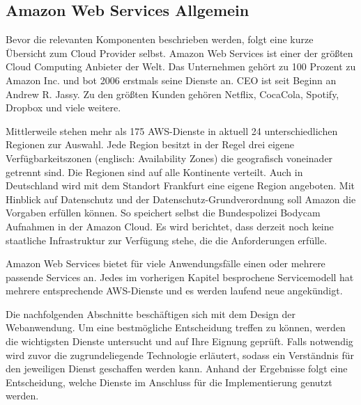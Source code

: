 \subsection{Amazon Web Services Allgemein}

Bevor die relevanten Komponenten beschrieben werden, folgt eine kurze Übersicht zum Cloud Provider selbst.
Amazon Web Services ist einer der größten Cloud Computing Anbieter der Welt. Das Unternehmen gehört zu 100 Prozent zu Amazon Inc. und bot 2006 erstmals seine Dienste an. CEO ist seit Beginn an Andrew R. Jassy.
Zu den größten Kunden gehören Netflix, CocaCola, Spotify, Dropbox und viele weitere. \cite[]{AWSAllgemein}

Mittlerweile stehen mehr als 175 AWS-Dienste in aktuell 24 unterschiedlichen Regionen zur Auswahl.
Jede Region besitzt in der Regel drei eigene Verfügbarkeitszonen (englisch: Availability Zones) die geografisch voneinader getrennt sind.
Die Regionen sind auf alle Kontinente verteilt.
Auch in Deutschland wird mit dem Standort Frankfurt eine eigene Region angeboten.
Mit Hinblick auf Datenschutz und der Datenschutz-Grundverordnung soll Amazon die Vorgaben erfüllen können.
So speichert selbst die Bundespolizei Bodycam Aufnahmen in der Amazon Cloud.\cite[]{AWSPolizei}
Es wird berichtet, {}\glqq dass derzeit noch keine staatliche Infrastruktur zur Verfügung stehe, die die Anforderungen erfülle.\grqq{}
\cite[Abschnitt 1]{AWSPolizei}

Amazon Web Services bietet für viele Anwendungsfälle einen oder mehrere passende Services an.
Jedes im vorherigen Kapitel besprochene Servicemodell hat mehrere entsprechende AWS-Dienste und es werden laufend neue angekündigt.


Die nachfolgenden Abschnitte beschäftigen sich mit dem Design der Webanwendung.
Um eine bestmögliche Entscheidung treffen zu können, werden die wichtigsten Dienste untersucht und auf Ihre Eignung geprüft.
Falls notwendig wird zuvor die zugrundeliegende Technologie erläutert, sodass ein Verständnis für den jeweiligen Dienst geschaffen werden kann.
Anhand der Ergebnisse folgt eine Entscheidung, welche Dienste im Anschluss für die Implementierung genutzt werden.




